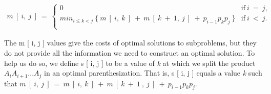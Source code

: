 \begin{ceqn}
\begin{align}
m\ [\ i,\ j\ ]\ =\ \left\{
\begin{array}{ll}
0 & \mathrm {if\ } i\ =\ j, \\
min_{i \leq k < j}\ \lbrace\ m\ [\ i,\ k\ ]\ +\ m\ [\ k\ +\ 1,\ j\ ]\ +\ p_{i-1} p_{k} p_{j}\ \rbrace & \mathrm {if\ } i\ <\ j.\\
\end{array}
\right.
\end{align}
\end{ceqn} \hfill \break

The m [ i, j ] values give the costs of optimal solutions to subproblems, but they do not provide all the information we need to construct an optimal solution. To help us do so, we define s [ i, j ] to be a value of {\itshape k} at which we split the product $A_{i} A_{i+1} ... A_{j}$ in an optimal parenthesization. That is, s [ i, j ] equals a value {\itshape k} such that $m\ [\ i,\ j\ ]\ =\ m\ [\ i,\ k\ ]\ +\ m\ [\ k\ +\ 1\ ,\ j\ ]\ +\ p_{i-1} p_{k} p_{j}$.

\pagebreak

